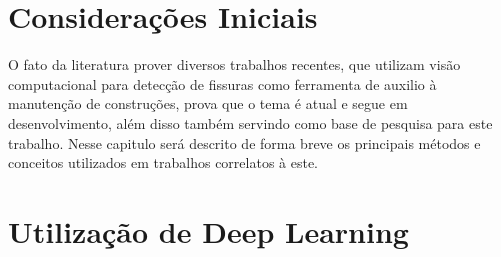 \section{Considerações Iniciais}

O fato da literatura prover diversos trabalhos recentes, que utilizam visão computacional para detecção de fissuras como ferramenta de auxilio à manutenção de construções, prova que o tema é atual e segue em desenvolvimento, além disso também servindo como base de pesquisa para este trabalho. Nesse capitulo será descrito de forma breve os principais métodos e conceitos utilizados em trabalhos correlatos à este.



\section{Utilização de Deep Learning}

